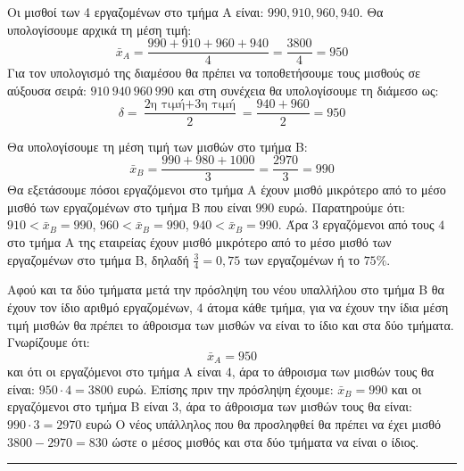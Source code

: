 \begin{alist}
\item 
Οι μισθοί των 4 εργαζομένων στο τμήμα Α είναι:
$990, 910, 960, 940$.
Θα υπολογίσουμε αρχικά τη μέση τιμή:
\[ \bar{x}_A = \frac{990 + 910 + 960 + 940}{4} = \frac{3800}{4} = 950 \]
Για τον υπολογισμό της διαμέσου θα πρέπει να τοποθετήσουμε τους μισθούς σε αύξουσα σειρά:
$910 \ 940 \ 960 \ 990$
και στη συνέχεια θα υπολογίσουμε τη διάμεσο ως:
\[ \delta = \frac{\text{2η τιμή} + \text{3η τιμή}}{2} = \frac{940 + 960}{2} = 950 \]
\item Θα υπολογίσουμε τη μέση τιμή των μισθών στο τμήμα Β:
\[ \bar{x}_B = \frac{990 + 980 + 1000}{3} = \frac{2970}{3} = 990 \]
Θα εξετάσουμε πόσοι εργαζόμενοι στο τμήμα Α έχουν μισθό μικρότερο από το μέσο μισθό των εργαζομένων στο τμήμα Β που είναι $990$ ευρώ. Παρατηρούμε ότι:
$910 < \bar{x}_B = 990$,
$960 < \bar{x}_B = 990$,
$940 < \bar{x}_B = 990$.
Άρα $3$ εργαζόμενοι από τους $4$ στο τμήμα Α της εταιρείας έχουν μισθό μικρότερο από το μέσο μισθό των εργαζομένων στο τμήμα Β, δηλαδή $\frac{3}{4} = 0,75$ των εργαζομένων ή το $75\%$.
\item Αφού και τα δύο τμήματα μετά την πρόσληψη του νέου υπαλλήλου στο τμήμα Β θα έχουν τον ίδιο αριθμό εργαζομένων, $4$ άτομα κάθε τμήμα, για να έχουν την ίδια μέση τιμή μισθών θα πρέπει το άθροισμα των μισθών να είναι το ίδιο και στα δύο τμήματα.
Γνωρίζουμε ότι:
\[ \bar{x}_A = 950 \]
και ότι οι εργαζόμενοι στο τμήμα Α είναι $4$, άρα το άθροισμα των μισθών τους θα είναι: $950 \cdot 4 = 3800$ ευρώ.
Επίσης πριν την πρόσληψη έχουμε: $\bar{x}_B = 990$ και οι εργαζόμενοι στο τμήμα Β είναι $3$, άρα το άθροισμα των μισθών τους θα είναι: $990 \cdot 3 = 2970$ ευρώ
Ο νέος υπάλληλος που θα προσληφθεί θα πρέπει να έχει μισθό $3800 - 2970 = 830$ ώστε ο μέσος μισθός και στα δύο τμήματα να είναι ο ίδιος.
\end{alist}
\vspace{6mm}
\noindent\rule{\textwidth}{0.4pt}
\vspace{6mm}


